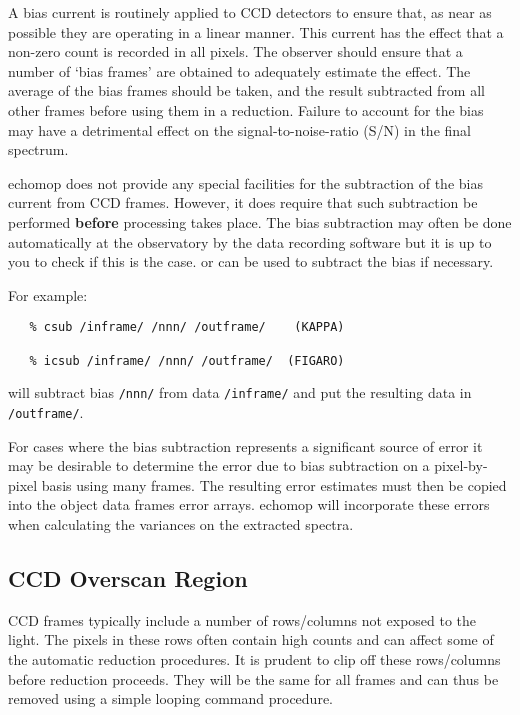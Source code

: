A bias current is routinely applied to CCD detectors to ensure that, as
near as possible they are operating in a linear manner. This current
has the effect that a non-zero count is recorded in all pixels. The
observer should ensure that a number of `bias frames' are obtained to
adequately estimate the effect. The average of the bias frames should
be taken, and the result subtracted from all other frames before using
them in a reduction.  Failure to account for the bias may have a
detrimental effect on the signal-to-noise-ratio (S/N) in the final
spectrum.

{\sc echomop} does not provide any special facilities for the subtraction
of the bias current from CCD frames.  However, it does require that such
subtraction be performed {\bf before} processing takes place.
The bias subtraction may often be done automatically at the observatory
by the data recording software but it is up to you to check if this
is the case.
 or  can be
used to subtract the bias if necessary.

For example:
\begin{verbatim}
   % csub /inframe/ /nnn/ /outframe/    (KAPPA)

   % icsub /inframe/ /nnn/ /outframe/  (FIGARO)
\end{verbatim}

will subtract bias {\tt /nnn/} from data {\tt /inframe/} and put the
resulting data in {\tt /outframe/}\@.

For cases where the bias subtraction represents a significant source of
error it may be desirable to determine the error due to bias subtraction
on a pixel-by-pixel basis using many frames.
The resulting error estimates must then be copied into the object data
frames error arrays.
{\sc echomop} will incorporate these errors when calculating the
variances on the extracted spectra.

\subsection{CCD Overscan Region}
CCD frames typically include a number of rows/columns not exposed to the
light. The pixels in these rows often contain high counts and can affect
some of the automatic reduction procedures. It is prudent to clip off
these rows/columns before reduction proceeds. They will be the same for
all frames and can thus be removed using a simple looping command procedure.



